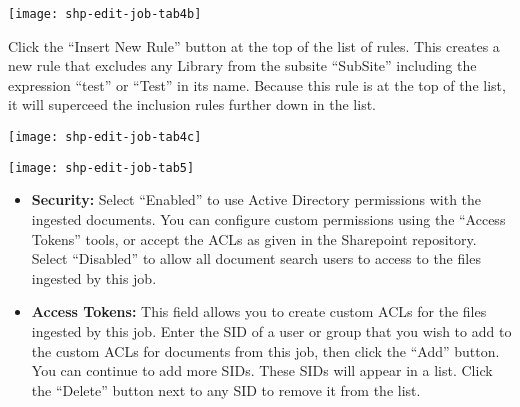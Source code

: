 \texttt{[image: shp-edit-job-tab4b]}


Click the ``Insert New Rule'' button at the top of the list of rules. This
creates a new rule that excludes
any Library from the subsite ``SubSite'' including the expression
``test'' or ``Test'' in its name. Because this rule is at the top of the list, it will superceed the inclusion rules further down in the list.

\texttt{[image: shp-edit-job-tab4c]}



\texttt{[image: shp-edit-job-tab5]}

\begin{itemize}

\item \textbf{Security:} Select ``Enabled'' to use Active Directory permissions with the ingested documents. You can configure custom permissions using the ``Access Tokens'' tools, or accept the ACLs as given in the Sharepoint repository. Select ``Disabled'' to allow all document search users to access to the files ingested by this job.

\item \textbf{Access Tokens:} This field allows you to create custom ACLs for the files ingested by this job. Enter the SID of a user or group that you wish to add to the custom ACLs for documents from this job, then click the ``Add'' button. You can continue to add more SIDs. These SIDs will appear in a list. Click the ``Delete'' button next to any SID to remove it from the list.

\end{itemize}



